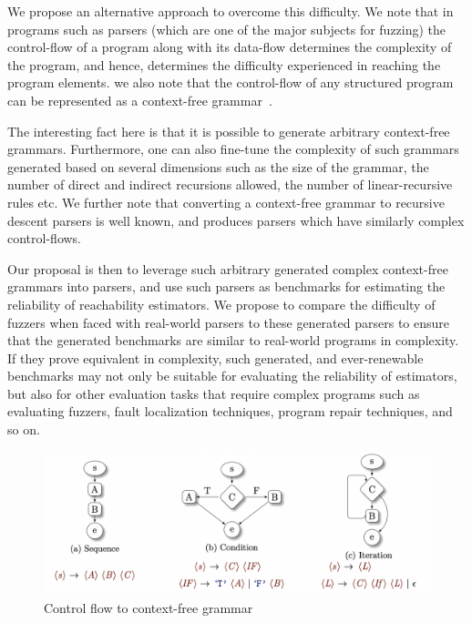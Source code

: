 \documentclass[conference]{IEEEtran}
\begin{document}
We propose an alternative approach to overcome this difficulty. We note that
in programs such as parsers (which are one of the major subjects for fuzzing)
the control-flow of a program along with its data-flow determines the
complexity of the program, and hence, determines the difficulty
experienced in reaching the program elements. we also note that the
control-flow of any structured program can be represented as a context-free
grammar~.

The interesting fact here is that it is possible to generate arbitrary
context-free grammars. Furthermore, one can also fine-tune the complexity
of such grammars generated based on several dimensions such as the size
of the grammar, the number of direct and indirect recursions allowed, the
number of linear-recursive rules etc.
We further note that converting a context-free grammar to recursive descent
parsers is well known, and produces parsers which have similarly complex
control-flows.

Our proposal is then to leverage such arbitrary generated complex
context-free grammars into parsers, and use such parsers as benchmarks for
estimating the reliability of reachability estimators. We propose to compare
the difficulty of fuzzers when faced with real-world parsers to these
generated parsers to ensure that the generated benchmarks are similar to
real-world programs in complexity. If they prove equivalent in complexity,
such generated, and ever-renewable benchmarks may not only be suitable for
evaluating the reliability of estimators, but also for other evaluation
tasks that require complex programs such as evaluating fuzzers,
fault localization techniques, program repair techniques, and so on.

\begin{figure}
  \includegraphics[width=\textwidth]{basiccfg.pdf}
  \caption{Control flow to context-free grammar}
  \label{fig:cfg}
\end{figure}
\end{document}

